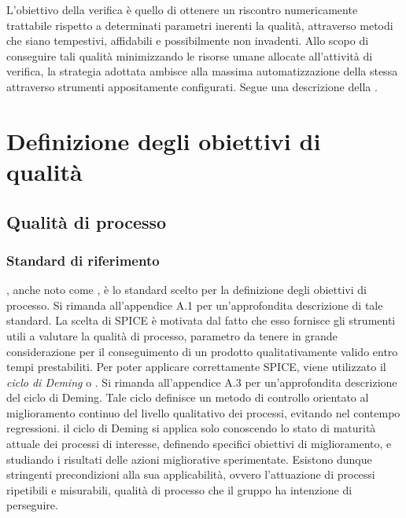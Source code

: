 \documentclass[openany,12pt,a4paper]{report}
\begin{document}
    L'obiettivo della verifica è quello di ottenere un riscontro numericamente trattabile rispetto a determinati parametri inerenti la qualità, attraverso metodi che siano tempestivi, affidabili e possibilmente non invadenti.
    Allo scopo di conseguire tali qualità minimizzando le risorse umane allocate all'attività di verifica, la strategia adottata ambisce alla massima automatizzazione della stessa attraverso strumenti appositamente configurati. Segue una descrizione della .
    
    \section{Definizione degli obiettivi di qualità}    
        
        \subsection{Qualità di processo}
        
        \subsubsection{Standard di riferimento}
        
        , anche noto come , è lo standard scelto per la definizione degli obiettivi di processo. Si rimanda all'appendice A.1 per un'approfondita descrizione di tale standard.
        La scelta di SPICE è motivata dal fatto che esso fornisce gli strumenti utili a valutare la qualità di processo, parametro da tenere in grande considerazione per il conseguimento di un prodotto qualitativamente valido entro tempi prestabiliti. 
        Per poter applicare correttamente SPICE, viene utilizzato il \textit{ciclo di Deming} o . Si rimanda all'appendice A.3 per un'approfondita descrizione del ciclo di Deming. Tale ciclo definisce un metodo di controllo orientato al miglioramento continuo del livello qualitativo dei processi, evitando nel contempo regressioni. il ciclo di Deming si applica solo conoscendo lo stato di maturità attuale dei processi di interesse, definendo specifici obiettivi di miglioramento, e studiando i risultati delle azioni migliorative sperimentate. Esistono dunque  stringenti precondizioni alla sua applicabilità, ovvero l'attuazione di processi ripetibili e misurabili, qualità di processo che il gruppo ha intenzione di perseguire.
        
\end{document}
